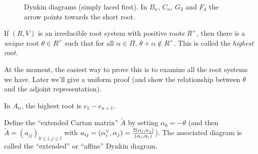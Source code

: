 \begin{figure}[!htbp]
\caption{Dynkin diagrams (simply laced first). In $B_n$, $C_n$, $G_2$ and
$F_4$ the arrow points towards the short root.}
\label{fig:dynkin}
\end{figure}


\begin{exercise}
If $(R, V)$ is an irreducible root system with positive roots $R^+$, then there
is a \emph{unique} root $\theta \in R^+$ such that for all $\alpha \in \Pi$,
$\theta + \alpha \notin R^+$. This is called the \emph{highest root}.

At the moment, the easiest way to prove this is to examine all the root
systems we have. Later we'll give a uniform proof (and show the relationship
between $\theta$ and the adjoint representation).
\end{exercise}

\begin{example}
In $A_n$, the highest root is $e_1 - e_{n+1}$.
\end{example}

Define the ``extended Cartan matrix'' $\tilde A$ by setting
$\alpha_0 = -\theta$ (and then $\tilde A = (a_{ij})_{0 \leq i, j \leq l}$ with
$a_{ij} = (\alpha_i^{\vee}, \alpha_j) = \frac{2(\alpha_i, \alpha_j)}{(\alpha_i, \alpha_i)}$).
The associated diagram is called the ``extended'' or ``affine'' Dynkin diagram.

